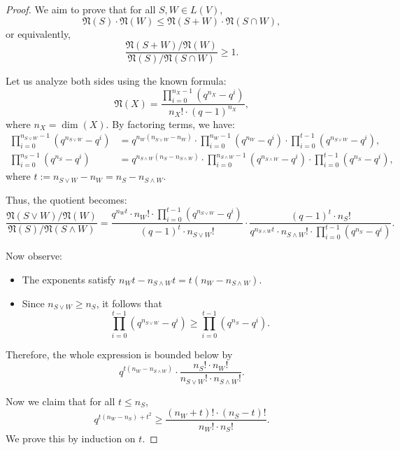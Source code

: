 \documentclass{svproc}
\begin{document}
\begin{proof}
    \item[(i)] We aim to prove that for all \( S, W \in L(V) \),
		\[
		\mathfrak{N}(S) \cdot \mathfrak{N}(W) \leq \mathfrak{N}(S + W) \cdot \mathfrak{N}(S \cap W),
		\]
		or equivalently,
		\[
		\frac{\mathfrak{N}(S + W)/\mathfrak{N}(W)}{\mathfrak{N}(S)/\mathfrak{N}(S \cap W)} \geq 1.
		\]
		
		Let us analyze both sides using the known formula:
		\[
		\mathfrak{N}(X) = \frac{\prod_{i=0}^{n_X - 1}(q^{n_X} - q^i)}{n_X! \cdot (q - 1)^{n_X}},
		\]
		where \( n_X = \dim(X) \). By factoring terms, we have:
		\begin{align*}
		\prod_{i=0}^{n_{S \vee W} - 1}(q^{n_{S \vee W}} - q^i)
		&= q^{n_W(n_{S \vee W} - n_W)} \cdot \prod_{i=0}^{n_W - 1}(q^{n_W} - q^i) \cdot \prod_{i=0}^{t - 1}(q^{n_{S \vee W}} - q^i), \\
		\prod_{i=0}^{n_S - 1}(q^{n_S} - q^i)
		&= q^{n_{S \wedge W}(n_S - n_{S \wedge W})} \cdot \prod_{i=0}^{n_{S \wedge W} - 1}(q^{n_{S \wedge W}} - q^i) \cdot \prod_{i=0}^{t - 1}(q^{n_S} - q^i),
		\end{align*}
		where \( t := n_{S \vee W} - n_W = n_S - n_{S \wedge W} \).
		
		Thus, the quotient becomes:
		\[
		\frac{\mathfrak{N}(S \vee W)/\mathfrak{N}(W)}{\mathfrak{N}(S)/\mathfrak{N}(S \wedge W)} = 
		\frac{
			q^{n_W t} \cdot n_W! \cdot \prod_{i=0}^{t - 1}(q^{n_{S \vee W}} - q^i)
		}{
			(q - 1)^t \cdot n_{S \vee W}!
		}
		\cdot
		\frac{
			(q - 1)^t \cdot n_S!
		}{
			q^{n_{S \wedge W} t} \cdot n_{S \wedge W}! \cdot \prod_{i=0}^{t - 1}(q^{n_S} - q^i)
		}.
		\]
		
		Now observe:
		\begin{itemize}
			\item The exponents satisfy \( n_W t - n_{S \wedge W} t = t(n_W - n_{S \wedge W}) \).
			\item Since \( n_{S \vee W} \geq n_S \), it follows that
			\[
			\prod_{i=0}^{t - 1}(q^{n_{S \vee W}} - q^i) \geq \prod_{i=0}^{t - 1}(q^{n_S} - q^i).
			\]
		\end{itemize}
		
		Therefore, the whole expression is bounded below by
		\[
		q^{t(n_W - n_{S \wedge W})} \cdot \frac{n_S! \cdot n_W!}{n_{S \vee W}! \cdot n_{S \wedge W}!}.
		\]
		
		Now we claim that for all \( t \leq n_S \),
		\[
		q^{t(n_W - n_S) + t^2} \geq \frac{(n_W + t)! \cdot (n_S - t)!}{n_W! \cdot n_S!}.
		\]
		We prove this by induction on \( t \).
		

\end{proof}
\end{document}

